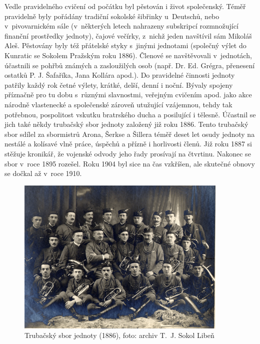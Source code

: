 \documentclass[a5paper, 11pt, twoside]{article}
\begin{document}
{\sloppy Vedle pravidelného cvičení od počátku byl pěstován i život společenský. Téměř pravidelně byly pořádány tradiční sokolské šibřinky u~Deutschů, nebo v~pivovarnickém sále (v~některých letech nahrazeny subskripcí rozmnožující finanční prostředky jednoty), čajové večírky, z~nichž jeden navštívil sám Mikoláš Aleš. Pěstovány byly též přátelské styky s~jinými jednotami (společný výlet do Kunratic se Sokolem Pražským roku 1886). Členové se navštěvovali v~jednotách, účastnili se pohřbů známých a zasloužilých osob (např. Dr. Ed. Grégra, přenesení ostatků P. J. Šafaříka, Jana Kollára apod.). Do pravidelné činnosti jednoty patřily každý rok četné výlety, krátké, delší, denní i noční. Bývaly spojeny příznačně pro tu dobu s~různými slavnostmi, veřejným cvičením apod. jako akce národně vlastenecké a společenské zároveň utužující vzájemnou, tehdy tak potřebnou, pospolitost vskutku bratrského ducha a posilující i tělesně. Účastnil se jich také někdy trubačský sbor jednoty založený již roku 1886. Tento trubačský sbor sdílel za sbormistrů Arona, Šerkse a Šillera téměř deset let osudy jednoty na nestálé a kolísavé vlně práce, úspěchů a přízně i horlivosti členů. Již roku 1887 si stěžuje kronikář, že vojenské odvody jeho řady prosívají na čtvrtinu. Nakonec se sbor v~roce 1895 rozešel. Roku 1904 byl sice na čas vzkříšen, ale skutečné obnovy se dočkal až v~roce 1910. \par}

\begin{figure}[h!]
  \centering
   \includegraphics[width=0.9\textwidth]{img/06_trubaci.jpg}
  \caption*{Trubačský sbor jednoty (1886), foto: archiv T.~J. Sokol Libeň}
\end{figure}
\end{document}
